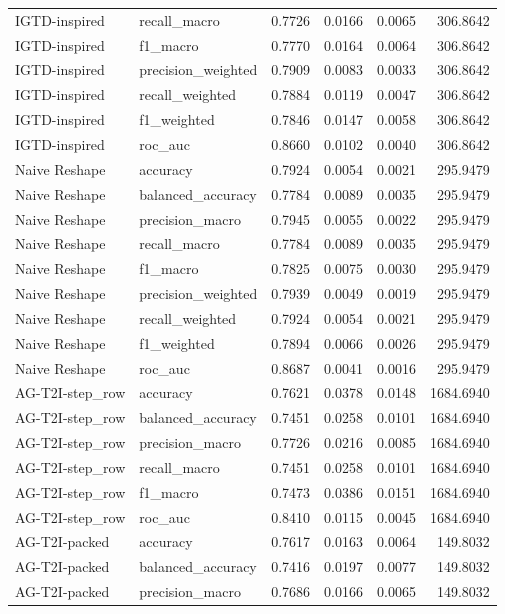 \begin{tabular}{llrrrr}
IGTD-inspired & recall_macro & 0.7726 & 0.0166 & 0.0065 & 306.8642 \\
IGTD-inspired & f1_macro & 0.7770 & 0.0164 & 0.0064 & 306.8642 \\
IGTD-inspired & precision_weighted & 0.7909 & 0.0083 & 0.0033 & 306.8642 \\
IGTD-inspired & recall_weighted & 0.7884 & 0.0119 & 0.0047 & 306.8642 \\
IGTD-inspired & f1_weighted & 0.7846 & 0.0147 & 0.0058 & 306.8642 \\
IGTD-inspired & roc_auc & 0.8660 & 0.0102 & 0.0040 & 306.8642 \\
Naive Reshape & accuracy & 0.7924 & 0.0054 & 0.0021 & 295.9479 \\
Naive Reshape & balanced_accuracy & 0.7784 & 0.0089 & 0.0035 & 295.9479 \\
Naive Reshape & precision_macro & 0.7945 & 0.0055 & 0.0022 & 295.9479 \\
Naive Reshape & recall_macro & 0.7784 & 0.0089 & 0.0035 & 295.9479 \\
Naive Reshape & f1_macro & 0.7825 & 0.0075 & 0.0030 & 295.9479 \\
Naive Reshape & precision_weighted & 0.7939 & 0.0049 & 0.0019 & 295.9479 \\
Naive Reshape & recall_weighted & 0.7924 & 0.0054 & 0.0021 & 295.9479 \\
Naive Reshape & f1_weighted & 0.7894 & 0.0066 & 0.0026 & 295.9479 \\
Naive Reshape & roc_auc & 0.8687 & 0.0041 & 0.0016 & 295.9479 \\
AG-T2I-step_row & accuracy & 0.7621 & 0.0378 & 0.0148 & 1684.6940 \\
AG-T2I-step_row & balanced_accuracy & 0.7451 & 0.0258 & 0.0101 & 1684.6940 \\
AG-T2I-step_row & precision_macro & 0.7726 & 0.0216 & 0.0085 & 1684.6940 \\
AG-T2I-step_row & recall_macro & 0.7451 & 0.0258 & 0.0101 & 1684.6940 \\
AG-T2I-step_row & f1_macro & 0.7473 & 0.0386 & 0.0151 & 1684.6940 \\
AG-T2I-step_row & roc_auc & 0.8410 & 0.0115 & 0.0045 & 1684.6940 \\
AG-T2I-packed & accuracy & 0.7617 & 0.0163 & 0.0064 & 149.8032 \\
AG-T2I-packed & balanced_accuracy & 0.7416 & 0.0197 & 0.0077 & 149.8032 \\
AG-T2I-packed & precision_macro & 0.7686 & 0.0166 & 0.0065 & 149.8032 \\

\end{tabular}

